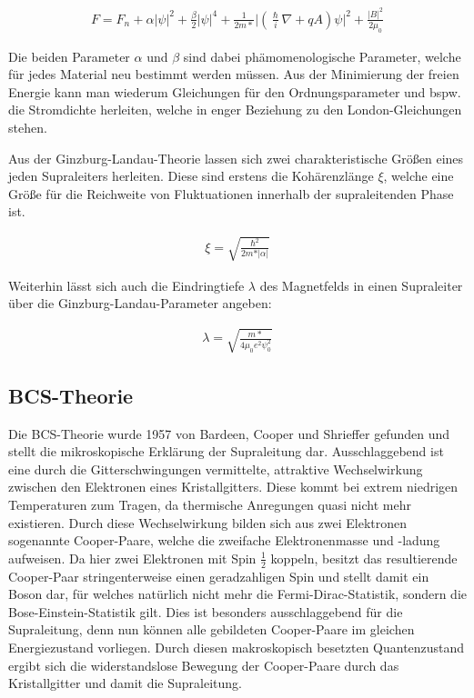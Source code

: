 \begin{align}
F=F_n + \alpha \vert\psi\vert^2 +\frac{\beta}{2}\vert\psi\vert^4+\frac{1}{2m*}\vert\left(\frac{\hslash}{i}\nabla +qA\right)\psi\vert^2 + \frac{\vert B \vert^2}{2\mu_0}
\end{align}

Die beiden Parameter $\alpha$ und $\beta$ sind dabei phämomenologische Parameter, welche für jedes Material neu bestimmt werden müssen. Aus der Minimierung der freien Energie kann man wiederum Gleichungen für den Ordnungsparameter und bspw. die Stromdichte herleiten, welche in enger Beziehung zu den London-Gleichungen stehen. 

Aus der Ginzburg-Landau-Theorie lassen sich zwei charakteristische Größen eines jeden Supraleiters herleiten. Diese sind erstens die Kohärenzlänge $\xi$, welche eine Größe für die Reichweite von Fluktuationen innerhalb der supraleitenden Phase ist.

\begin{align}
\xi= \sqrt{\frac{\hslash^2}{2m*\vert\alpha\vert}}
\end{align}

Weiterhin lässt sich auch die Eindringtiefe $\lambda$ des Magnetfelds in einen Supraleiter über die Ginzburg-Landau-Parameter angeben:

\begin{align}
\lambda=\sqrt{\frac{m*}{4\mu_0e^2\psi_0^2}}
\end{align}


\subsection{BCS-Theorie}

Die BCS-Theorie wurde 1957 von Bardeen, Cooper und Shrieffer gefunden und stellt die mikroskopische Erklärung der Supraleitung dar. Ausschlaggebend ist eine durch die Gitterschwingungen vermittelte, attraktive Wechselwirkung zwischen den Elektronen eines Kristallgitters. Diese kommt bei extrem niedrigen Temperaturen zum Tragen, da thermische Anregungen quasi nicht mehr existieren. Durch diese Wechselwirkung bilden sich aus zwei Elektronen sogenannte Cooper-Paare, welche die zweifache Elektronenmasse und -ladung aufweisen. Da hier zwei Elektronen mit Spin $\frac{1}{2}$ koppeln, besitzt das resultierende Cooper-Paar stringenterweise einen geradzahligen Spin und stellt damit ein Boson dar, für welches natürlich nicht mehr die Fermi-Dirac-Statistik, sondern die Bose-Einstein-Statistik gilt. Dies ist besonders ausschlaggebend für die Supraleitung, denn nun können alle gebildeten Cooper-Paare im gleichen Energiezustand vorliegen. Durch diesen makroskopisch besetzten Quantenzustand ergibt sich die widerstandslose Bewegung der Cooper-Paare durch das Kristallgitter und damit die Supraleitung. 

